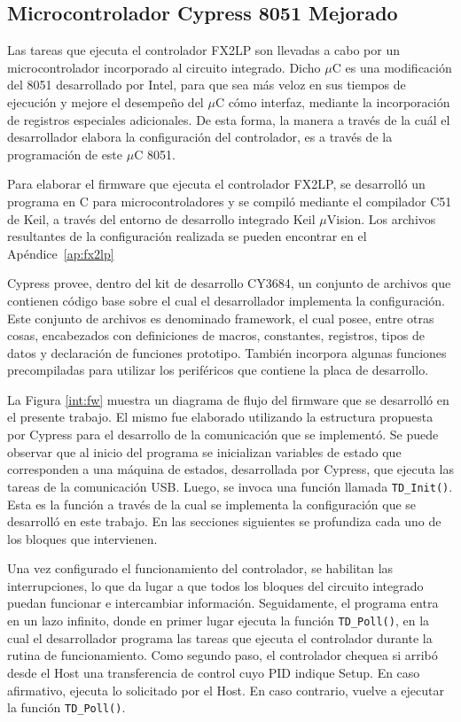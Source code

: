 \subsection{Microcontrolador Cypress 8051 Mejorado}
	Las tareas que ejecuta el controlador FX2LP son llevadas a cabo por un microcontrolador incorporado al circuito integrado. Dicho $\mu$C es una modificación del 8051 desarrollado por Intel, para que sea más veloz en sus tiempos de ejecución y mejore el desempeño del $\mu$C cómo interfaz, mediante la incorporación de registros especiales adicionales.  De esta forma, la manera a través de la cuál el desarrollador elabora la configuración del controlador, es a través de la programación de este $\mu$C 8051.
	
	Para elaborar el firmware que ejecuta el controlador FX2LP, se desarrolló un programa en C para microcontroladores y se compiló mediante el compilador C51 de Keil, a través del entorno de desarrollo integrado Keil $\mu$Vision. Los archivos resultantes de la configuración realizada se pueden encontrar en el Apéndice~\ref{ap:fx2lp}
	
	Cypress provee, dentro del kit de desarrollo CY3684, un conjunto de archivos que contienen código base sobre el cual el desarrollador implementa la configuración. Este conjunto de archivos es denominado framework, el cual posee, entre otras cosas, encabezados con definiciones de macros, constantes, registros, tipos de datos y declaración de funciones prototipo. También incorpora algunas funciones precompiladas para utilizar los periféricos que contiene la placa de desarrollo.
	
	La Figura \ref{int:fw} muestra un diagrama de flujo del firmware que se desarrolló en el presente trabajo. El mismo fue elaborado utilizando la estructura propuesta por Cypress para el desarrollo de la comunicación que se implementó. Se puede observar que al inicio del programa se inicializan variables de estado que corresponden a una máquina de estados, desarrollada por Cypress, que ejecuta las tareas de la comunicación USB. Luego, se invoca una función llamada \verb|TD_Init()|. Esta es la función a través de la cual se implementa la configuración que se desarrolló en este trabajo. En las secciones siguientes se profundiza cada uno de los bloques que intervienen.
	
	Una vez configurado el funcionamiento del controlador, se habilitan las interrupciones, lo que da lugar a que todos los bloques del circuito integrado puedan funcionar e intercambiar información. Seguidamente, el programa entra en un lazo infinito, donde en primer lugar ejecuta la función \verb|TD_Poll()|, en la cual el desarrollador programa las tareas que ejecuta el controlador durante la rutina de funcionamiento. Como segundo paso, el controlador chequea si arribó desde el Host una transferencia de control cuyo PID indique Setup. En caso afirmativo, ejecuta lo solicitado por el Host. En caso contrario, vuelve a ejecutar la función \verb|TD_Poll()|.
	

